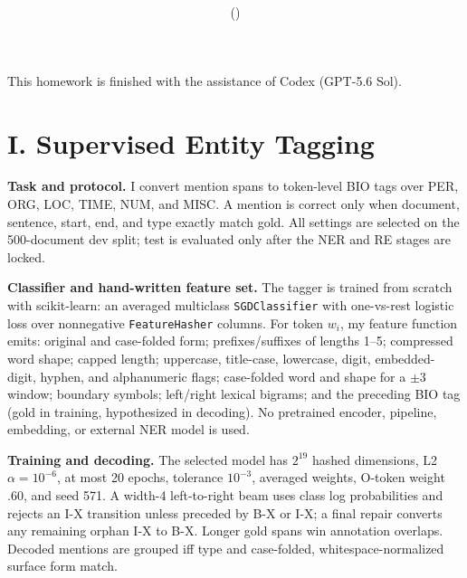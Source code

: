 \documentclass[10pt]{article}
\title{\vspace{-1.85cm}\large\course\\[0.12em]\normalsize\assignment}
\author{\small\studentname\quad (\studentid)}\date{}
\begin{document}
\fontsize{8.8}{10.15}\selectfont
\maketitle\thispagestyle{fancy}\vspace{-1.55em}
This homework is finished with the assistance of Codex (GPT-5.6 Sol).

\section*{I. Supervised Entity Tagging}
\textbf{Task and protocol.}
I convert mention spans to token-level BIO tags over PER, ORG, LOC, TIME, NUM,
and MISC. A mention is correct only when document, sentence, start, end, and
type exactly match gold. All settings are selected on the 500-document dev
split; test is evaluated only after the NER and RE stages are locked.

\textbf{Classifier and hand-written feature set.}
The tagger is trained from scratch with scikit-learn: an averaged multiclass
\texttt{SGDClassifier} with one-vs-rest logistic loss over nonnegative
\texttt{FeatureHasher} columns. For token $w_i$, my feature function emits:
original and case-folded form; prefixes/suffixes of lengths 1--5; compressed
word shape; capped length; uppercase, title-case, lowercase, digit,
embedded-digit, hyphen, and alphanumeric flags; case-folded word and shape for
a $\pm3$ window; boundary symbols; left/right lexical bigrams; and the preceding
BIO tag (gold in training, hypothesized in decoding). No pretrained encoder,
pipeline, embedding, or external NER model is used.

\textbf{Training and decoding.}
The selected model has $2^{19}$ hashed dimensions, L2 $\alpha=10^{-6}$, at
most 20 epochs, tolerance $10^{-3}$, averaged weights, O-token weight .60, and
seed 571. A width-4 left-to-right beam uses class log probabilities and rejects
an I-X transition unless preceded by B-X or I-X; a final repair converts any
remaining orphan I-X to B-X. Longer gold spans win annotation overlaps.
Decoded mentions are grouped iff type and case-folded, whitespace-normalized
surface form match.
\end{document}
